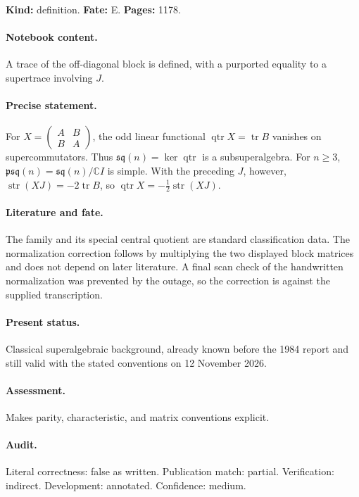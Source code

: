 \label{item:1983-626.9}

\noindent\textbf{Kind:} definition. \textbf{Fate:} E. \textbf{Pages:} 1178.\par

\paragraph{Notebook content.} A trace of the off-diagonal block is defined, with a purported equality to a supertrace involving \(J\).

\paragraph{Precise statement.} For \(X=\begin{pmatrix}A&B\\B&A\end{pmatrix}\), the odd linear functional \(\operatorname{qtr}X=\operatorname{tr}B\) vanishes on supercommutators. Thus \(\mathfrak{sq}(n)=\ker\operatorname{qtr}\) is a subsuperalgebra. For \(n\ge3\), \(\mathfrak{psq}(n)=\mathfrak{sq}(n)/\mathbb CI\) is simple. With the preceding \(J\), however, \(\operatorname{str}(XJ)=-2\operatorname{tr}B\), so \(\operatorname{qtr}X=-\frac12\operatorname{str}(XJ)\).

\paragraph{Literature and fate.} The family and its special central quotient are standard classification data. The normalization correction follows by multiplying the two displayed block matrices and does not depend on later literature. A final scan check of the handwritten normalization was prevented by the outage, so the correction is against the supplied transcription.

\paragraph{Present status.} Classical superalgebraic background, already known before the 1984 report and still valid with the stated conventions on 12 November 2026.

\paragraph{Assessment.} Makes parity, characteristic, and matrix conventions explicit.

\paragraph{Audit.} Literal correctness: false as written. Publication match: partial. Verification: indirect. Development: annotated. Confidence: medium.

